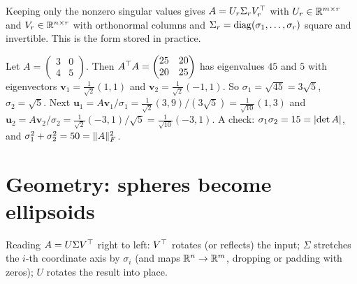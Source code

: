 \begin{definition}
Keeping only the nonzero singular values gives $A=U_r\Sigma_rV_r^{\top}$ with $U_r\in\mathbb{R}^{m\times r}$ and $V_r\in\mathbb{R}^{n\times r}$ with orthonormal columns and $\Sigma_r=\operatorname{diag}(\sigma_1,\dots,\sigma_r)$ square and invertible. This is the form stored in practice.
\end{definition}

\begin{example}\label{ex:svd}
Let $A=\begin{pmatrix}3&0\\4&5\end{pmatrix}$. Then $A^{\top} A=\begin{pmatrix}25&20\\20&25\end{pmatrix}$ has eigenvalues $45$ and $5$ with eigenvectors $\mathbf{v}_1=\frac1{\sqrt2}(1,1)$ and $\mathbf{v}_2=\frac1{\sqrt2}(-1,1)$. So $\sigma_1=\sqrt{45}=3\sqrt5$, $\sigma_2=\sqrt5$. Next $\mathbf{u}_1=A\mathbf{v}_1/\sigma_1=\frac1{\sqrt2}(3,9)/(3\sqrt5)=\frac1{\sqrt{10}}(1,3)$ and $\mathbf{u}_2=A\mathbf{v}_2/\sigma_2=\frac1{\sqrt2}(-3,1)/\sqrt5=\frac1{\sqrt{10}}(-3,1)$. A check: $\sigma_1\sigma_2=15=\lvert\det A\rvert$, and $\sigma_1^2+\sigma_2^2=50=\lVert A\rVert_F^2$.
\end{example}

\section{Geometry: spheres become ellipsoids}

Reading $A=U\Sigma V^{\top}$ right to left: $V^{\top}$ rotates (or reflects) the input; $\Sigma$ stretches the $i$-th coordinate axis by $\sigma_i$ (and maps $\mathbb{R}^n\to\mathbb{R}^m$, dropping or padding with zeros); $U$ rotates the result into place.

